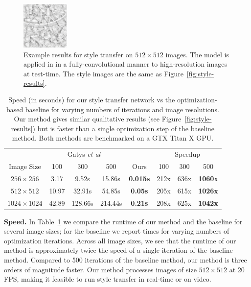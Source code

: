 \documentclass[runningheads]{llncs}
\newcommand{\etal}{\textit{et al}}
\begin{document}
\begin{figure}[t]
  \includegraphics[width=0.21\textwidth]{1071_sketch_512.jpg}
  \vspace{-3mm}
  \caption{Example results for style transfer on $512\times512$ images. The model
    is applied in in a fully-convolutional manner to high-resolution images at test-time.
    The style images are the same as Figure~\ref{fig:style-results}.
  }
  \label{fig:style-results-512}
\end{figure}

\begin{table}[t]
  \centering
  \begin{tabular}{c||ccc|c||ccc}
    & \multicolumn{3}{c|}{Gatys \etal~\cite{gatys2015neural}} & 
    & \multicolumn{3}{c}{Speedup}\\
    Image Size & 100 & 300 & 500 \hspace{1mm} &
    \hspace{1mm} Ours \hspace{1mm} & \hspace{1mm} 100 & 300 & 500 \\
    \hline
    $256 \times 256$ & 3.17 & 9.52s & 15.86s &
    \textbf{0.015s} & 212x & 636x & \textbf{1060x} \\
    $512 \times 512$ & 10.97 & 32.91s & 54.85s &
    \textbf{0.05s} & 205x & 615x & \textbf{1026x} \\
    $1024 \times 1024$ & 42.89 & 128.66s & 214.44s &
    \textbf{0.21s} & 208x & 625x & \textbf{1042x}\\
  \end{tabular}
  \vspace{1mm}
  \caption{Speed (in seconds) for our style transfer network vs the optimization-based
    baseline for varying numbers of iterations and image resolutions.
    Our method gives similar qualitative results (see Figure~\ref{fig:style-results})
    but is faster than a single optimization step of the baseline method. Both methods
    are benchmarked on a GTX Titan X GPU.
  }
  \label{tab:style-speed}
  \vspace{-8mm}
\end{table}

\noindent \textbf{Speed.}
In Table~\ref{tab:style-speed} we compare the runtime of our method and the baseline
for several image sizes; for the baseline we report times for varying numbers of optimization
iterations. Across all image sizes, we see that the runtime of our method is approximately
twice the speed of a single iteration of the baseline method. Compared to 500 iterations of
the baseline method, our method is three orders of magnitude faster. Our method processes
images of size $512\times512$ at 20 FPS, making it feasible to run style transfer in
real-time or on video.
\end{document}
